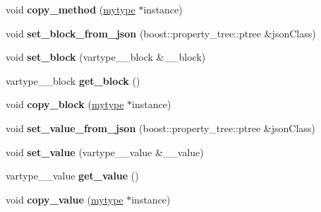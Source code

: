 \begin{DoxyCompactItemize}
void {\bfseries copy\+\_\+method} (\hyperlink{classfilter_1_1algos_1_1_binary_adaptive}{mytype} $\ast$instance)
\item 
\mbox{\label{classfilter_1_1algos_1_1_binary_adaptive_a4c8005c27121340d846d3731bbe3e5d5}} 
void {\bfseries set\+\_\+block\+\_\+from\+\_\+json} (boost\+::property\+\_\+tree\+::ptree \&json\+Class)
\item 
\mbox{\label{classfilter_1_1algos_1_1_binary_adaptive_a91706d3d3696dc83a5873e05271224ee}} 
void {\bfseries set\+\_\+block} (vartype\+\_\+\+\_\+block \&\+\_\+\+\_\+block)
\item 
\mbox{\label{classfilter_1_1algos_1_1_binary_adaptive_a351cb7df5ae8b4a704b310f7580d5309}} 
vartype\+\_\+\+\_\+block {\bfseries get\+\_\+block} ()
\item 
\mbox{\label{classfilter_1_1algos_1_1_binary_adaptive_a749bf777c5d9804becf9964375e61733}} 
void {\bfseries copy\+\_\+block} (\hyperlink{classfilter_1_1algos_1_1_binary_adaptive}{mytype} $\ast$instance)
\item 
\mbox{\label{classfilter_1_1algos_1_1_binary_adaptive_a3b6091314dfc7c9e6d54ec428749d2c9}} 
void {\bfseries set\+\_\+value\+\_\+from\+\_\+json} (boost\+::property\+\_\+tree\+::ptree \&json\+Class)
\item 
\mbox{\label{classfilter_1_1algos_1_1_binary_adaptive_a3fe7e1d537b24d7f9b9c187451892deb}} 
void {\bfseries set\+\_\+value} (vartype\+\_\+\+\_\+value \&\+\_\+\+\_\+value)
\item 
\mbox{\label{classfilter_1_1algos_1_1_binary_adaptive_aab420592e5dd56029eaee8cb569282d0}} 
vartype\+\_\+\+\_\+value {\bfseries get\+\_\+value} ()
\item 
\mbox{\label{classfilter_1_1algos_1_1_binary_adaptive_ac67c6bf1667e3fb68fb14df1629de378}} 
void {\bfseries copy\+\_\+value} (\hyperlink{classfilter_1_1algos_1_1_binary_adaptive}{mytype} $\ast$instance)

\end{DoxyCompactItemize}
